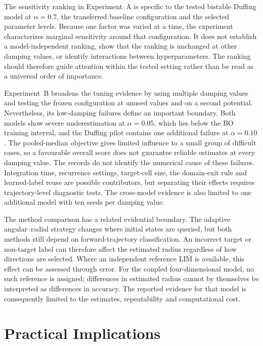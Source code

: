 \begin{greenrevision}
The sensitivity ranking in Experiment~A is specific to the tested bistable Duffing model at $\alpha=0.7$, the transferred baseline configuration and the selected parameter levels. Because one factor was varied at a time, the experiment characterizes marginal sensitivity around that configuration. It does not establish a model-independent ranking, show that the ranking is unchanged at other damping values, or identify interactions between hyperparameters. The ranking should therefore guide attention within the tested setting rather than be read as a universal order of importance.

Experiment~B broadens the tuning evidence by using multiple damping values and testing the frozen configuration at unused values and on a second potential. Nevertheless, its low-damping failures define an important boundary. Both models show severe underestimation at $\alpha=0.05$, which lies below the BO training interval, and the Duffing pilot contains one additional failure at $\alpha=0.10$. The pooled-median objective gives limited influence to a small group of difficult cases, so a favourable overall score does not guarantee reliable estimates at every damping value. The records do not identify the numerical cause of these failures. Integration time, recurrence settings, target-cell size, the domain-exit rule and learned-label reuse are possible contributors, but separating their effects requires trajectory-level diagnostic tests. The cross-model evidence is also limited to one additional model with ten seeds per damping value.

The method comparison has a related evidential boundary. The adaptive angular--radial strategy changes where initial states are queried, but both methods still depend on forward-trajectory classification. An incorrect target or non-target label can therefore affect the estimated radius regardless of how directions are selected. Where an independent reference LIM is available, this effect can be assessed through error. For the coupled four-dimensional model, no such reference is assigned; differences in estimated radius cannot by themselves be interpreted as differences in accuracy. The reported evidence for that model is consequently limited to the estimates, repeatability and computational cost.
\end{greenrevision}

\section{Practical Implications}
\label{sec:discussion-practical}

